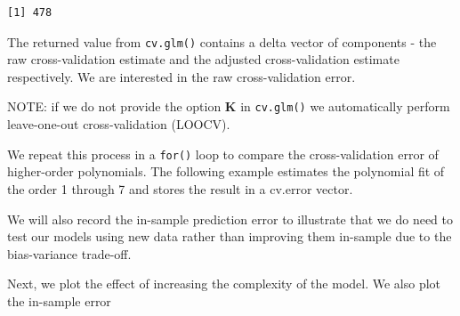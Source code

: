 \documentclass[]{article}
\newenvironment{Shaded}{\begin{snugshade}}{\end{snugshade}}
\newcommand{\CommentTok}[1]{\textcolor[rgb]{0.56,0.35,0.01}{\textit{#1}}}
\newcommand{\ControlFlowTok}[1]{\textcolor[rgb]{0.13,0.29,0.53}{\textbf{#1}}}
\newcommand{\DataTypeTok}[1]{\textcolor[rgb]{0.13,0.29,0.53}{#1}}
\newcommand{\DecValTok}[1]{\textcolor[rgb]{0.00,0.00,0.81}{#1}}
\newcommand{\KeywordTok}[1]{\textcolor[rgb]{0.13,0.29,0.53}{\textbf{#1}}}
\newcommand{\NormalTok}[1]{#1}
\newcommand{\OperatorTok}[1]{\textcolor[rgb]{0.81,0.36,0.00}{\textbf{#1}}}
\newcommand{\OtherTok}[1]{\textcolor[rgb]{0.56,0.35,0.01}{#1}}
\newcommand{\StringTok}[1]{\textcolor[rgb]{0.31,0.60,0.02}{#1}}
\begin{document}
\begin{verbatim}
[1] 478
\end{verbatim}

The returned value from \texttt{cv.glm()} contains a delta vector of components - the raw cross-validation estimate and the adjusted cross-validation estimate respectively. We are interested in the raw cross-validation error.

NOTE: if we do not provide the option \textbf{K} in \texttt{cv.glm()} we automatically perform leave-one-out cross-validation (LOOCV).

We repeat this process in a \texttt{for()} loop to compare the cross-validation error of higher-order polynomials. The following example estimates the polynomial fit of the order 1 through 7 and stores the result in a cv.error vector.

We will also record the in-sample prediction error to illustrate that we do need to test our models using new data rather than improving them in-sample due to the bias-variance trade-off.

\begin{Shaded}
\end{Shaded}

Next, we plot the effect of increasing the complexity of the model. We also plot the in-sample error
\end{document}
